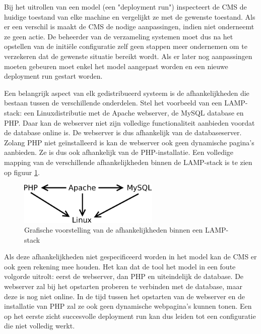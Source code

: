Bij het uitrollen van een model (een "deployment run") inspecteert de CMS de huidige toestand van elke machine en vergelijkt ze met de gewenste toestand.
Als er een verschil is maakt de CMS de nodige aanpassingen, indien niet onderneemt ze geen actie.
De beheerder van de verzameling systemen moet dus na het opstellen van de initi\"ele configuratie zelf geen stappen meer ondernemen om te verzekeren dat de gewenste situatie bereikt wordt.
Als er later nog aanpassingen moeten gebeuren moet enkel het model aangepast worden en een nieuwe deployment run gestart worden.

Een belangrijk aspect van elk gedistribueerd systeem is de afhankelijkheden die bestaan tussen de verschillende onderdelen.
Stel het voorbeeld van een LAMP-stack: een Linuxdistributie met de Apache webserver, de MySQL database en PHP.
Daar kan de webserver niet zijn volledige functionaliteit aanbieden voordat de database online is.
De webserver is dus afhankelijk van de databaseserver.
Zolang PHP niet ge\"installeerd is kan de webserver ook geen dynamische pagina's aanbieden.
Ze is dus ook afhankelijk van de PHP-installatie.
Een volledige mapping van de verschillende afhankelijkheden binnen de LAMP-stack is te zien op figuur \ref{fig:lamp_dep}.
\begin{figure}[h]
    \begin{center}
    \includegraphics[width=0.6\textwidth]{images/lamp_dep.pdf}
    \caption{Grafische voorstelling van de afhankelijkheden binnen een LAMP-stack}
    \label{fig:lamp_dep}
    \end{center}
\end{figure}

Als deze afhankelijkheden niet gespecificeerd worden in het model kan de CMS er ook geen rekening mee houden.
Het kan dat de tool het model in een foute volgorde uitrolt: eerst de webserver, dan PHP en uiteindelijk de database.
De webserver zal bij het opstarten proberen te verbinden met de database, maar deze is nog niet online.
In de tijd tussen het opstarten van de webserver en de installatie van PHP zal ze ook geen dynamische webpagina's kunnen tonen.
Een op het eerste zicht succesvolle deployment run kan dus leiden tot een configuratie die niet volledig werkt.

